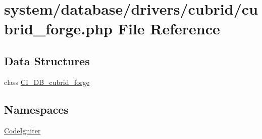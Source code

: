 \hypertarget{cubrid__forge_8php}{\section{system/database/drivers/cubrid/cubrid\-\_\-forge.php File Reference}
\label{cubrid__forge_8php}
}
\subsection*{Data Structures}
\begin{DoxyCompactItemize}
\item 
class \hyperlink{class_c_i___d_b__cubrid__forge}{C\-I\-\_\-\-D\-B\-\_\-cubrid\-\_\-forge}
\end{DoxyCompactItemize}
\subsection*{Namespaces}
\begin{DoxyCompactItemize}
\item 
\hyperlink{namespace_code_igniter}{Code\-Igniter}
\end{DoxyCompactItemize}
